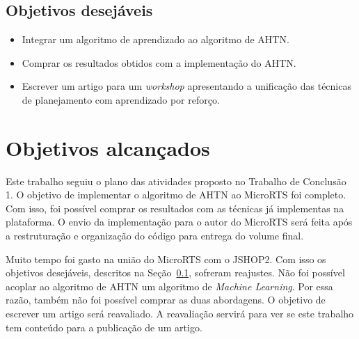 \subsection{Objetivos desejáveis} \label{sec:objdesej}
\begin{itemize}
	\item Integrar um algoritmo de aprendizado ao algoritmo de AHTN.
	\item Comprar os resultados obtidos com a implementação do AHTN.
	\item Escrever um artigo para um \textit{workshop} apresentando a unificação das técnicas de planejamento com aprendizado por reforço.
\end{itemize}

\section{Objetivos alcançados}

Este trabalho seguiu o plano das atividades proposto no Trabalho de Conclusão 1.
O objetivo de implementar o algoritmo de AHTN ao MicroRTS foi completo.
Com isso, foi possível comprar os resultados com as técnicas já implementas na plataforma.
O envio da implementação para o autor do MicroRTS será feita após a restruturação e organização do código para entrega do volume final.

Muito tempo foi gasto na união do MicroRTS com o JSHOP2. 
Com isso os objetivos desejáveis, descritos na Seção~\ref{sec:objdesej}, sofreram reajustes.
Não foi possível acoplar ao algoritmo de AHTN um algoritmo de \textit{Machine Learning}.
Por essa razão, também não foi possível comprar as duas abordagens.
O objetivo de escrever um artigo será reavaliado.
A reavaliação servirá para ver se este trabalho tem conteúdo para a publicação de um artigo.



